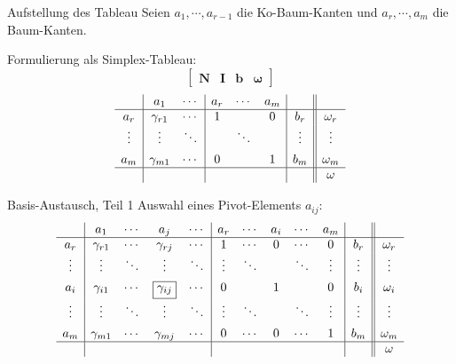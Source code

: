 \documentclass[accentcolor = tud11b, colorbacktitle, landscape, german, presentation, tudmathserif]{tudbeamer}
\newcommand{\mat}[1]{\boldsymbol{\mathbf{#1}}}
\renewcommand{\vec}[1]{\boldsymbol{\mathbf{#1}}}
\let\oldvdots=\vdots
\renewcommand{\vdots}{\raisebox{2pt}{\(\oldvdots\)}}
\let\oldddots=\ddots
\renewcommand{\ddots}{\raisebox{2pt}{\(\oldddots\)}}
\begin{document}
			\begin{frame}{Aufstellung des Tableau}
				Seien \( a_1, \cdots, a_{r - 1} \) die Ko-Baum-Kanten und \( a_r, \cdots, a_m \) die Baum-Kanten.
			
				Formulierung als Simplex-Tableau:
				\begin{equation*}
					\left[\!\begin{array}{ccc||c}
						\mat{N} & \mat{I} & \vec{b} & \vec{\omega}
					\end{array}\!\right]
				\end{equation*}
				\begin{equation*}
					\begin{array}{c|cc|ccc|c||c}
						       &     a_1     & \cdots & a_r & \cdots & a_m &        &          \\ \hline
						 a_r   & \gamma_{r1} & \cdots &  1  &        &  0  &  b_r   & \omega_r \\
						\vdots &   \vdots    & \ddots &     & \ddots &     & \vdots &  \vdots  \\
						 a_m   & \gamma_{m1} & \cdots &  0  &        &  1  &  b_m   & \omega_m \\ \hline
						       &             &        &     &        &     &        &  \omega
					\end{array}
				\end{equation*}
			\end{frame}
		
			\begin{frame}{Basis-Austausch, Teil 1}
				Auswahl eines Pivot-Elements \( a_{ij} \):
				\begin{equation*}
					\begin{array}{c|cccc|ccccc|c||c}
						       &     a_1     & \cdots &            a_j             & \cdots &  a_r   & \cdots & a_i & \cdots &  a_m   &        &          \\ \hline
						 a_r   & \gamma_{r1} & \cdots &        \gamma_{rj}         & \cdots &   1    & \cdots &  0  & \cdots &   0    &  b_r   & \omega_r \\
						\vdots &   \vdots    & \ddots &           \vdots           & \ddots & \vdots & \ddots &     & \ddots & \vdots & \vdots &  \vdots  \\
						 a_i   & \gamma_{i1} & \cdots & \framebox{\(\gamma_{ij}\)} & \cdots &   0    &        &  1  &        &   0    &  b_i   & \omega_i \\
						\vdots &   \vdots    & \ddots &           \vdots           & \ddots & \vdots & \ddots &     & \ddots & \vdots & \vdots &  \vdots  \\
						 a_m   & \gamma_{m1} & \cdots &        \gamma_{mj}         & \cdots &   0    & \cdots &  0  & \cdots &   1    &  b_m   & \omega_m \\ \hline
						       &             &        &                            &        &        &        &     &        &        &        &  \omega
					\end{array}
				\end{equation*}
			\end{frame}
		
\end{document}
